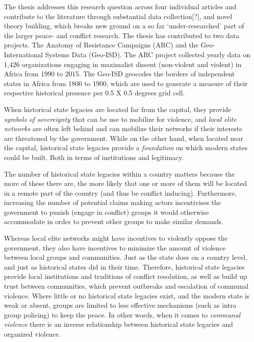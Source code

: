 \documentclass[12pt]{article}
\begin{document}
The thesis addresses this research question across four individual articles and
contribute to the literature through substantial data collection[?], and novel
theory building, which breaks new ground on a so far `under-researched' part of
the larger peace- and conflict research. The thesis has contributed to two data
projects. The Anatomy of Resistance Campaigns (ARC) and the Geo-International
Systems Data (Geo-ISD). The ARC project collected yearly data on 1,426 organizations
engaging in maximalist dissent (non-violent and violent) in Africa from 1990 to
2015. The Geo-ISD geocodes the borders of independent states in Africa from
1800 to 1900, which are used to generate a measure of their respective
historical presence per 0.5 X 0.5 degrees grid cell. 

When historical state legacies are located far from the capital, they provide
\textit{symbols of sovereignty} that can be use to mobilize for violence, and
\textit{local elite networks} are often left behind and can mobilize their
networks if their interests are threatened by the government. While on the other
hand, when located near the capital, historical state legacies provide a
\textit{foundation} on which modern states could be built. Both in terms of
institutions and legitimacy.

The number of historical state legacies within a country matters because the
more of these there are, the more likely that one or more of them will be
located in a remote part of the country (and thus be conflict inducing).
Furthermore, increasing the number of potential claims making actors
incentivises the government to punish (engage in conflict) groups it would
otherwise accommodate in order to prevent other groups to make similar demands.

Whereas local elite networks might have incentives to violently oppose the
government, they also have incentives to minimize the amount of violence
between local groups and communities. Just as the state does on a country
level, and just as historical states did in their time. Therefore, historical
state legacies provide local institutions and traditions of conflict
resolution, as well as build up trust between communities, which prevent
outbreaks and escalation of communal violence. Where little or no historical
state legacies exist, and the modern state is weak or absent, groups are limited
to less effective mechanisms (such as intra group policing) to keep the peace.
In other words, when it comes to \textit{communal violence} there is an inverse
relationship between historical state legacies and organized violence.
\end{document}
